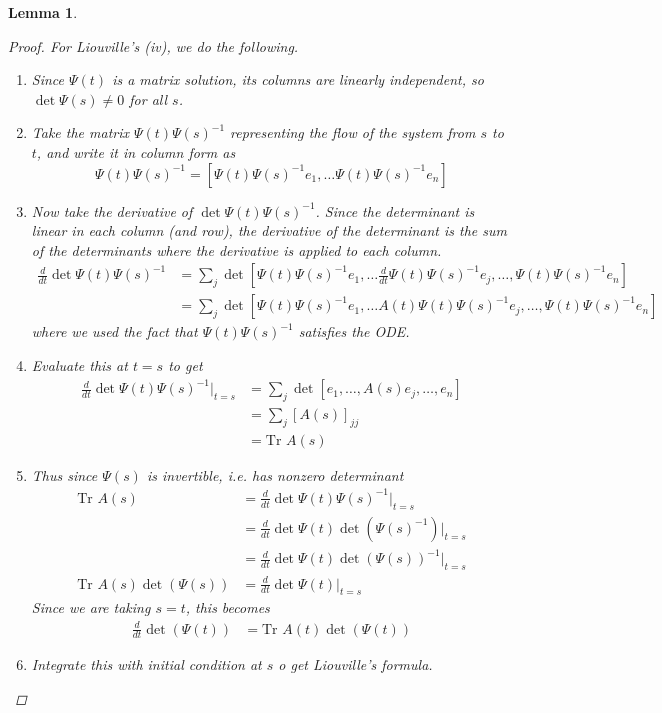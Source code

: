 \documentclass{article}
\newtheorem{lemma}[theorem]{Lemma}
\begin{document}
\begin{lemma}
\begin{proof}
For Liouville's (iv), we do the following.
\begin{enumerate}
\item Since $\Psi(t)$ is a matrix solution, its columns are linearly independent, so $\det \Psi(s) \neq 0$ for all $s$.
\item Take the matrix $\Psi(t)\Psi(s)^{-1}$ representing the flow of the system from $s$ to $t$, and write it in column form as
\[
\Psi(t)\Psi(s)^{-1} = \left[\Psi(t)\Psi(s)^{-1} e_1, \dots \Psi(t)\Psi(s)^{-1}e_n\right]
\]
\item Now take the derivative of $\det \Psi(t)\Psi(s)^{-1}$. Since the determinant is linear in each column (and row), the derivative of the determinant is the sum of the determinants where the derivative is applied to each column.
\begin{align*}
\frac{d}{dt} \det \Psi(t)\Psi(s)^{-1} &= \sum_j \det \left[\Psi(t)\Psi(s)^{-1} e_1, \dots \frac{d}{dt}\Psi(t)\Psi(s)^{-1}e_j, \dots, \Psi(t)\Psi(s)^{-1}e_n\right] \\
&= \sum_j \det \left[\Psi(t)\Psi(s)^{-1} e_1, \dots A(t) \Psi(t)\Psi(s)^{-1}e_j, \dots, \Psi(t)\Psi(s)^{-1}e_n\right]
\end{align*}
where we used the fact that $\Psi(t)\Psi(s)^{-1}$ satisfies the ODE.
\item Evaluate this at $t = s$ to get
\begin{align*}
\frac{d}{dt} \det \Psi(t)\Psi(s)^{-1}\Big|_{t = s} &= \sum_j \det \left[e_1, \dots, A(s) e_j, \dots, e_n\right] \\
&= \sum_j [A(s)]_{jj} \\
&= \text{Tr }A(s)
\end{align*}
\item Thus since $\Psi(s)$ is invertible, i.e. has nonzero determinant
\begin{align*}
\text{Tr }A(s) &= \frac{d}{dt} \det \Psi(t)\Psi(s)^{-1}\Big|_{t = s} \\
&= \frac{d}{dt} \det \Psi(t) \det(\Psi(s)^{-1}) \Big|_{t = s} \\ 
&= \frac{d}{dt} \det \Psi(t) \det(\Psi(s))^{-1} \Big|_{t = s} \\
\text{Tr }A(s) \det(\Psi(s)) &= \frac{d}{dt} \det \Psi(t)\Big|_{t = s}
\end{align*}
Since we are taking $s = t$, this becomes
\begin{align*}
\frac{d}{dt} \det(\Psi(t)) &= \text{Tr }A(t) \det(\Psi(t))
\end{align*}
\item Integrate this with initial condition at $s$ o get Liouville's formula.
\end{enumerate} 
\end{proof}
\end{lemma}
\end{document}
